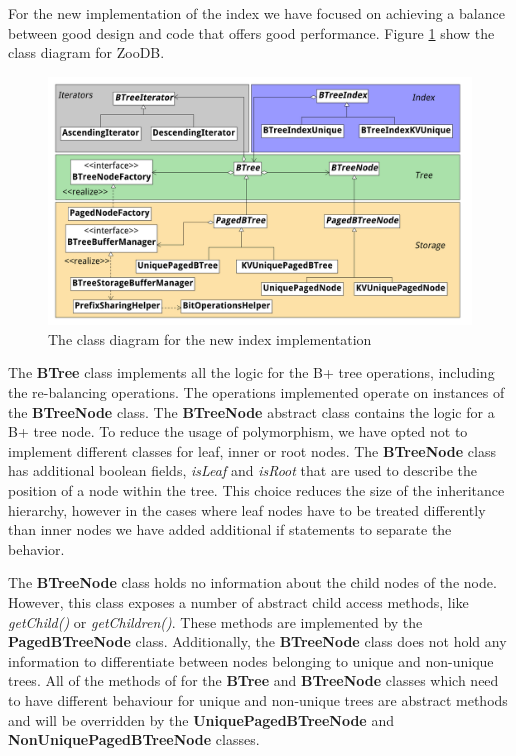 \documentclass[11pt,a4paper,oneside]{article}
\begin{document}
For the new implementation of the index we have focused on achieving a balance between good design and code that offers good performance. Figure \ref{fig:class-diagram} show the class diagram for ZooDB.  
\begin{figure}[ht]
\includegraphics[scale=0.089, center]{ZooDBClassDiagram} 
\caption{The class diagram for the new index implementation}
\label{fig:class-diagram}
\end{figure}

The \textbf{BTree} class implements all the logic for the B+ tree operations, including the re-balancing operations. The operations implemented operate on instances of the \textbf{BTreeNode} class. The \textbf{BTreeNode} abstract class contains the logic for a B+ tree node. To reduce the usage of polymorphism, we have opted not to implement different classes for leaf, inner or root nodes. The \textbf{BTreeNode} class has additional boolean fields, \textit{isLeaf} and \textit{isRoot} that are used to describe the position of a node within the tree. This choice reduces the size of the inheritance hierarchy, however in the cases where leaf nodes have to be treated differently than inner nodes we have added additional if statements to separate the behavior. 

The \textbf{BTreeNode} class holds no information about the child nodes of the node. However, this class exposes a number of abstract child access methods, like \textit{getChild()} or \textit{getChildren()}. These methods are implemented by the \textbf{PagedBTreeNode} class. Additionally, the \textbf{BTreeNode} class does not hold any information to differentiate between nodes belonging to unique and non-unique trees. All of the methods of for the \textbf{BTree} and \textbf{BTreeNode} classes which need to have different behaviour for unique and non-unique trees are abstract methods and will be overridden by the \textbf{UniquePagedBTreeNode} and \textbf{NonUniquePagedBTreeNode} classes.
\end{document}
